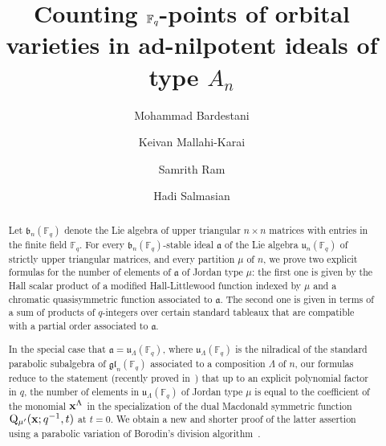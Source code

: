 \documentclass[12pt,a4paper,reqno]{amsart}
\title{Counting $\FF_q$-points of orbital varieties in ad-nilpotent ideals of type $A_n$}
\author[M. Bardestani]{Mohammad Bardestani}
\author[K. Mallahi-Karai]{Keivan Mallahi-Karai}
\author[S. Ram]{Samrith Ram}
\author[H. Salmasian]{Hadi Salmasian}
\theoremstyle{plain}
\theoremstyle{definition}
\newcommand{\FF}{{\mathbb{F}}}
\newcommand{\1}{\mathds{1}}
\newcommand{\Q}{\mathrm{Q}}
\renewcommand{\u}{\mathfrak{u}}
\newcommand{\gl}{\mathfrak{gl}}
\newcommand{\x}{{\bf x}}
\begin{document}
\subjclass{}

\begingroup
\def\uppercasenonmath#1{} %
\let\MakeUppercase\relax %
\maketitle
\endgroup

{
\footnotesize
\hypersetup{linkcolor=RedDef}
\tableofcontents
}


\begin{abstract}


Let $\mathfrak b_n(\FF_q)$  denote the Lie algebra of upper triangular $n\times n$ matrices with entries in the finite field $\FF_q$. For every $\mathfrak b_n(\FF_q)$-stable ideal $\mathfrak a$ of the Lie algebra $\u_n(\FF_q)$ of strictly upper triangular matrices, and every partition $\mu$ of $n$, we prove two explicit formulas for the number of elements of $\mathfrak a$ of Jordan type $\mu$: the first one is given 
by the Hall scalar product of a modified Hall-Littlewood function indexed by $\mu$ and a  chromatic quasisymmetric function associated to $\mathfrak a$. The second one is  given in terms of  a sum of products of $q$-integers over certain standard tableaux that are compatible with a partial order associated to $\mathfrak a$.
  
In the special case that $\mathfrak a=\u_\Lambda(\FF_q)$, where 
$\u_\Lambda(\FF_q)$ is the nilradical of the standard parabolic subalgebra of $\gl_n(\FF_q)$ associated to a composition $\Lambda$ of $n$, our formulas reduce to the statement (recently proved in~\cite[Theorem 5.13]{Karp-Thomas}) that 
up to an explicit polynomial factor in $q$, the number of elements in $\u_\Lambda(\FF_q)$ of Jordan type $\mu$ is equal to the coefficient of the monomial $\x^\Lambda$ in the specialization of the dual Macdonald symmetric function $\Q_{\mu'}(\x;q^{-1},t)$ at $t=0$.
We obtain a new and shorter  proof of the latter assertion
using a parabolic variation of Borodin's division algorithm~\cite{Borodin,Kirillov}.



\end{abstract}
\end{document}
